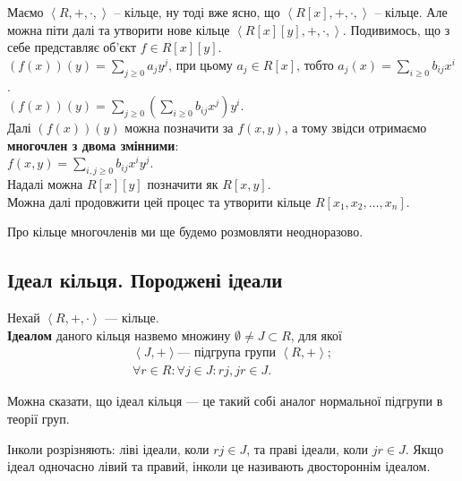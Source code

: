 \documentclass{math_library}
\begin{document}
\begin{remark}
Маємо $\left<R,+,\cdot,\right>$ -- кільце, ну тоді вже ясно, що $\left<R[x],+,\cdot,\right>$ -- кільце. Але можна піти далі та утворити нове кільце $\left<R[x][y],+,\cdot,\right>$. Подивимось, що з себе представляє об'єкт $f \in R[x][y]$.\\
$(f(x))(y) = \displaystyle\sum_{j \geq 0} a_j y^j$, при цьому $a_j \in R[x]$, тобто $a_j(x) = \displaystyle\sum_{i \geq 0} b_{ij} x^i$.\\
$(f(x))(y) = \displaystyle\sum_{j \geq 0} \left(\sum_{i \geq 0} b_{ij} x^j\right) y^i$.\\
Далі $(f(x))(y)$ можна позначити за $f(x,y)$, а тому звідси отримаємо \textbf{многочлен з двома змінними}:\\
$f(x,y) = \displaystyle\sum_{i,j \geq 0} b_{ij} x^i y^j$.\\
Надалі можна $R[x][y]$ позначити як $R[x,y]$.
\bigskip \\
Можна далі продовжити цей процес та утворити кільце $R[x_1,x_2,\dots,x_n]$.
\end{remark}

Про кільце многочленів ми ще будемо розмовляти неодноразово.

\subsection{Ідеал кільця. Породжені ідеали}
\begin{definition}
Нехай $\left<R,+,\cdot \right>$ --- кільце.\\
\textbf{Ідеалом} даного кільця назвемо множину $\emptyset \neq J \subset R$, для якої
\begin{align*}
\left<J,+ \right> \text{--- підгрупа групи } \left<R,+\right>; \\
\forall r \in R: \forall j \in J: rj, jr \in J.
\end{align*}
\end{definition}

\begin{remark}
Можна сказати, що ідеал кільця --- це такий собі аналог нормальної підгрупи в теорії груп.
\end{remark}

\begin{remark}
Інколи розрізняють: ліві ідеали, коли $rj \in J$, та праві ідеали, коли $jr \in J$. Якщо ідеал одночасно лівий та правий, інколи це називають двостороннім ідеалом.
\end{remark}
\end{document}
